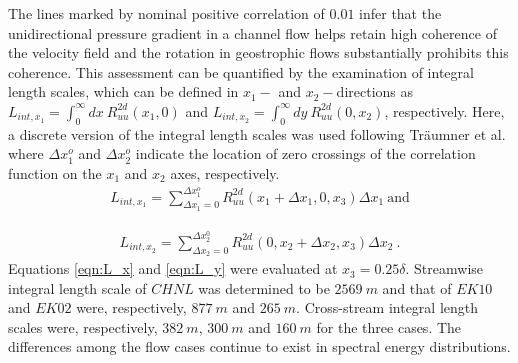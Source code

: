 The lines marked by nominal positive correlation of $0.01$ infer that the unidirectional pressure gradient in a channel flow helps retain high coherence of the velocity field and the rotation in geostrophic flows substantially prohibits this coherence. This assessment can be quantified by the examination of integral length scales, which can be defined in $x_1-$ and $x_2-$directions as $L_{int,x_1}=\int_0^{\infty} dx\ R_{uu}^{2d}(x_1,0)$ and $L_{int,x_2}=\int_0^{\infty} dy\ R_{uu}^{2d}(0,x_2)$, respectively. Here, a discrete version of the integral length scales was used following Tr{\"a}umner et al. \cite{traumner_blm_2015} where $\Delta x_1^{o}$ and $\Delta x_2^{o}$ indicate the location of zero crossings of the correlation function on the $x_1$ and $x_2$ axes, respectively. 
\begin{align}
L_{int,x_1}=\sum_{\Delta x_1=0}^{\Delta x_1^{o}}R_{uu}^{2d}(x_1+\Delta x_1, 0,x_3)\Delta x_1 \ \text{and}
\label{eqn:L_x}
\end{align}

\begin{align}
L_{int,x_2}=\sum_{\Delta x_2 = 0}^{\Delta x_2^{0}}R_{uu}^{2d}(0, x_2+\Delta x_2,x_3)\Delta x_2\ .
\label{eqn:L_y}
\end{align}
Equations \ref{eqn:L_x} and \ref{eqn:L_y} were evaluated at $x_3=0.25\delta$. Streamwise integral length scale of $CHNL$ was determined  to be $2569\ m$ and that of $EK10$ and $EK02$ were, respectively, $877\ m$ and $265\ m$. Cross-stream integral length scales were, respectively, $382\ m$, $300\ m$ and $160\ m$ for the three cases. The differences among the flow cases continue to exist in spectral energy distributions.  

